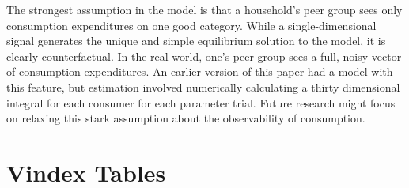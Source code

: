 \documentclass[12pt]{article}
\begin{document}
The strongest assumption in the model is that a household's peer group sees only consumption expenditures on one good category.  While a single-dimensional signal generates the unique and simple equilibrium solution to the model, it is clearly counterfactual.  In the real world, one's peer group sees a full, noisy vector of consumption expenditures.  An earlier version of this paper had a model with this feature, but estimation involved numerically calculating a thirty dimensional integral for each consumer for each parameter trial.  Future research might focus on relaxing this stark assumption about the observability of consumption.

\newpage




\newpage

\appendix

\section{Vindex Tables}
\label{sec:vin_tables}
\end{document}
